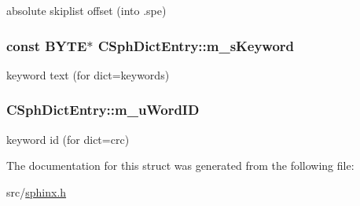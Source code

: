 absolute skiplist offset (into .spe) 

\hypertarget{structCSphDictEntry_a58f6fbd5ffd37a518e7e792030ed276e}{
\subsubsection[{m\-\_\-s\-Keyword}]{\setlength{\rightskip}{0pt plus 5cm}const {\bf B\-Y\-T\-E}$\ast$ C\-Sph\-Dict\-Entry\-::m\-\_\-s\-Keyword}}\label{structCSphDictEntry_a58f6fbd5ffd37a518e7e792030ed276e}


keyword text (for dict=keywords) 

\hypertarget{structCSphDictEntry_af0ae47ee68f60ba0965b7b9271d2c2c2}{
\subsubsection[{m\-\_\-u\-Word\-I\-D}]{ C\-Sph\-Dict\-Entry\-::m\-\_\-u\-Word\-I\-D}}\label{structCSphDictEntry_af0ae47ee68f60ba0965b7b9271d2c2c2}


keyword id (for dict=crc) 



The documentation for this struct was generated from the following file\-:\begin{DoxyCompactItemize}
\item 
src/\hyperlink{sphinx_8h}{sphinx.\-h}\end{DoxyCompactItemize}
